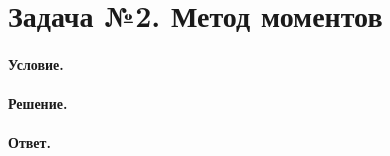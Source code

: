 
\section{Задача №2. Метод моментов}

\paragraph{Условие.} 

\paragraph{Решение.}

\paragraph{Ответ.} 
